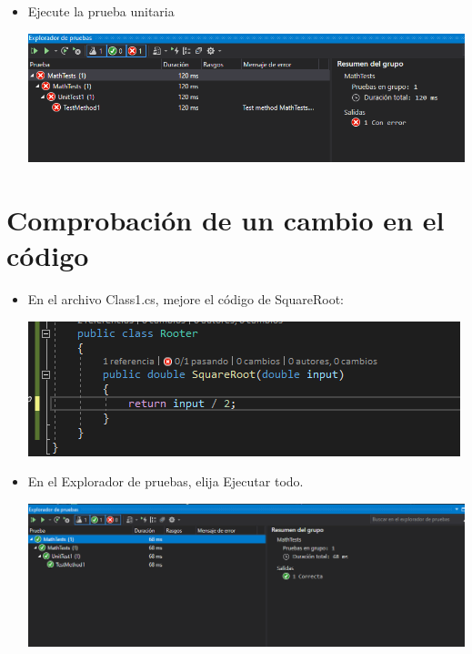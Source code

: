\begin{itemize}
\begin{center}
\end{center} 
\item Ejecute la prueba unitaria
\begin{center}
\includegraphics[width=\columnwidth]{images/6}\newline
\end{center} 
\end{itemize}
\section{Comprobación de un cambio en el código } 
\begin{itemize}
\item En el archivo Class1.cs, mejore el código de SquareRoot:
\begin{center}
\includegraphics[width=\columnwidth]{images/7}\newline
\end{center}
\item En el Explorador de pruebas, elija Ejecutar todo.
\begin{center}
\includegraphics[width=\columnwidth]{images/8}\newline
\end{center}
\end{itemize}

